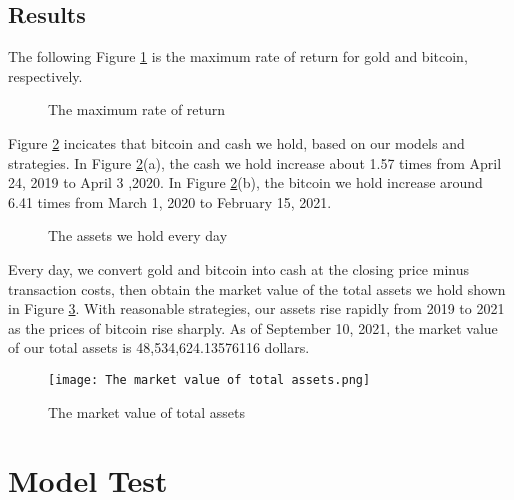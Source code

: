 \documentclass[12pt]{article}
\begin{document}
\subsection{Results}
The following Figure \ref{F7} is the maximum rate of return for gold and bitcoin, respectively.
\begin{figure}[hbt]
 \centering
 \quad
 \caption{The maximum rate of return}
 \label{F7} %
\end{figure}
Figure \ref{F12} incicates that bitcoin and cash we hold, based on our models and strategies. In Figure \ref{F12}(a), the cash we hold increase about 1.57 times from April 24, 2019 to April 3 ,2020. In Figure \ref{F12}(b), the bitcoin we hold increase around 6.41 times from March 1, 2020 to February 15, 2021.
\begin{figure}[hbt]
 \centering
 \quad
 \caption{The assets we hold every day}
 \label{F12} %
\end{figure}
Every day, we convert gold and bitcoin into cash at the closing price minus transaction costs, then obtain the market value of the total assets we hold shown in Figure \ref{F13}. With reasonable strategies, our assets rise rapidly from 2019 to 2021 as the prices of bitcoin rise sharply. As of September 10, 2021, the market value of our total assets is 48,534,624.13576116 dollars.
\begin{figure}
 \centering
 \texttt{[image: The market value of total assets.png]}
 \caption{The market value of total assets}
 \label{F13} %
\end{figure}

\section{Model Test}
\end{document}
